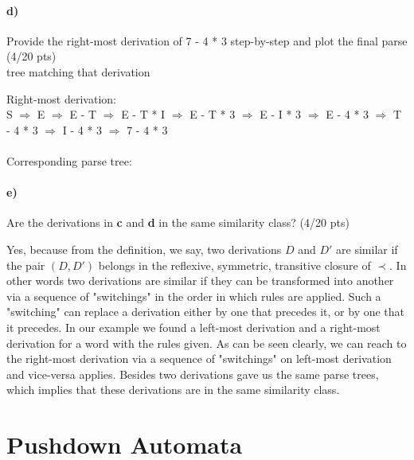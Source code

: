 \documentclass[a4paper,12pt]{article}
\begin{document}
\paragraph{d)} Provide the right-most derivation of 7 - 4 * 3 step-by-step and plot the final parse \hfill \small{(4/20 pts)} \\
 tree matching that derivation \\
\newpage
\begin{tcolorbox}
Right-most derivation:\\
S $\Rightarrow$ E $\Rightarrow$ E - T $\Rightarrow$ E - T * I $\Rightarrow$ E - T * 3 $\Rightarrow$ E - I * 3 $\Rightarrow$ E - 4 * 3 $\Rightarrow$ T - 4 * 3 $\Rightarrow$ I - 4 * 3 $\Rightarrow$ 7 - 4 * 3\\\\
Corresponding parse tree:\\
\end{tcolorbox}


\paragraph{e)} Are the derivations in \textbf{c} and \textbf{d} in the same similarity class?  \hfill \small{(4/20 pts)} \\
\begin{tcolorbox}
Yes, because from the definition, we say, two derivations $D$ and $D'$ are similar if the pair $(D,D')$ belongs in the reflexive, symmetric, transitive closure of $\prec$. In other words two derivations are similar if they can be transformed into another via a sequence of "switchings" in the order in which rules are applied. Such a "switching" can replace a derivation either by one that precedes it, or by one that it precedes. In our example we found a left-most derivation and a right-most derivation for a word with the rules given. As can be seen clearly, we can reach to the right-most derivation via a sequence of "switchings" on left-most derivation and vice-versa applies. Besides two derivations gave us the same parse trees, which implies that these derivations are in the same similarity class.
\end{tcolorbox}



\newpage
\section{Pushdown Automata \hfill {}}
\end{document}
